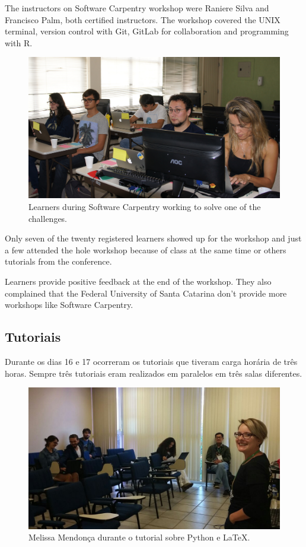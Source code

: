 \documentclass[12pt]{article}
\begin{document}
The instructors on Software Carpentry workshop were Raniere Silva and Francisco
Palm, both certified instructors.
The workshop covered the UNIX terminal, version control with Git,
GitLab for collaboration and programming with R.

\begin{figure}[!htb]
\center
\includegraphics[height=.3\textheight]{swc-students.jpg}
\caption{Learners during Software Carpentry working to solve one of the
challenges.}
\end{figure}

Only seven of the twenty registered learners showed up for the workshop
and just a few attended the hole workshop because of class at the same time
or others tutorials from the conference.

Learners provide positive feedback at the end of the workshop.
They also complained that the Federal University of Santa Catarina
don't provide more workshops like Software Carpentry.

\subsection*{Tutoriais}

Durante os dias 16 e 17 ocorreram os tutoriais que tiveram carga horária de três
horas. Sempre três tutoriais eram realizados em paralelos em três salas
diferentes.

\begin{figure}[!htb]
\center
\includegraphics[height=.3\textheight]{tutorial-latex.jpg}
\caption{Melissa Mendonça durante o tutorial sobre Python e LaTeX.}
\end{figure}
\end{document}
